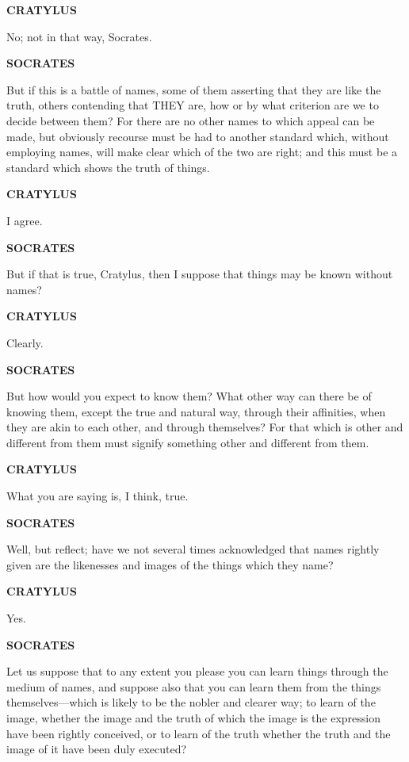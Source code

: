 \documentclass[11pt,letter]{article}
\begin{document}
\par \textbf{CRATYLUS}
\par   No; not in that way, Socrates.

\par \textbf{SOCRATES}
\par   But if this is a battle of names, some of them asserting that they are like the truth, others contending that THEY are, how or by what criterion are we to decide between them? For there are no other names to which appeal can be made, but obviously recourse must be had to another standard which, without employing names, will make clear which of the two are right; and this must be a standard which shows the truth of things.

\par \textbf{CRATYLUS}
\par   I agree.

\par \textbf{SOCRATES}
\par   But if that is true, Cratylus, then I suppose that things may be known without names?

\par \textbf{CRATYLUS}
\par   Clearly.

\par \textbf{SOCRATES}
\par   But how would you expect to know them? What other way can there be of knowing them, except the true and natural way, through their affinities, when they are akin to each other, and through themselves? For that which is other and different from them must signify something other and different from them.

\par \textbf{CRATYLUS}
\par   What you are saying is, I think, true.

\par \textbf{SOCRATES}
\par   Well, but reflect; have we not several times acknowledged that names rightly given are the likenesses and images of the things which they name?

\par \textbf{CRATYLUS}
\par   Yes.

\par \textbf{SOCRATES}
\par   Let us suppose that to any extent you please you can learn things through the medium of names, and suppose also that you can learn them from the things themselves—which is likely to be the nobler and clearer way; to learn of the image, whether the image and the truth of which the image is the expression have been rightly conceived, or to learn of the truth whether the truth and the image of it have been duly executed?
\end{document}
